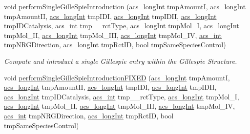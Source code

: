 \begin{DoxyCompactItemize}
void \hyperlink{a00011_a30a0827eed2860d03d5fa5318fcf86b0}{perform\-Single\-Gille\-Spie\-Introduction} (\hyperlink{a00024_a19319d75f02db4308bc5c0026d98cd85}{acs\-\_\-long\-Int} tmp\-Amount\-I, \hyperlink{a00024_a19319d75f02db4308bc5c0026d98cd85}{acs\-\_\-long\-Int} tmp\-Amount\-I\-I, \hyperlink{a00024_a19319d75f02db4308bc5c0026d98cd85}{acs\-\_\-long\-Int} tmp\-I\-D\-I, \hyperlink{a00024_a19319d75f02db4308bc5c0026d98cd85}{acs\-\_\-long\-Int} tmp\-I\-D\-I\-I, \hyperlink{a00024_a19319d75f02db4308bc5c0026d98cd85}{acs\-\_\-long\-Int} tmp\-I\-D\-Catalysis, \hyperlink{a00024_a8d277355641a098190360234e2ebde35}{acs\-\_\-int} tmp\-\_\-\-\_\-rct\-Type, \hyperlink{a00024_a19319d75f02db4308bc5c0026d98cd85}{acs\-\_\-long\-Int} tmp\-Mol\-\_\-\-I, \hyperlink{a00024_a19319d75f02db4308bc5c0026d98cd85}{acs\-\_\-long\-Int} tmp\-Mol\-\_\-\-I\-I, \hyperlink{a00024_a19319d75f02db4308bc5c0026d98cd85}{acs\-\_\-long\-Int} tmp\-Mol\-\_\-\-I\-I\-I, \hyperlink{a00024_a19319d75f02db4308bc5c0026d98cd85}{acs\-\_\-long\-Int} tmp\-Mol\-\_\-\-I\-V, \hyperlink{a00024_a8d277355641a098190360234e2ebde35}{acs\-\_\-int} tmp\-N\-R\-G\-Direction, \hyperlink{a00024_a19319d75f02db4308bc5c0026d98cd85}{acs\-\_\-long\-Int} tmp\-Rct\-I\-D, bool tmp\-Same\-Species\-Control)
\begin{DoxyCompactList}\small\item\em Compute and introduct a single Gillespie entry within the Gillespie Structure. \end{DoxyCompactList}\item 
void \hyperlink{a00011_a4ebb93b149e9ac023661f74657f634c7}{perform\-Single\-Gille\-Spie\-Introduction\-F\-I\-X\-E\-D} (\hyperlink{a00024_a19319d75f02db4308bc5c0026d98cd85}{acs\-\_\-long\-Int} tmp\-Amount\-I, \hyperlink{a00024_a19319d75f02db4308bc5c0026d98cd85}{acs\-\_\-long\-Int} tmp\-Amount\-I\-I, \hyperlink{a00024_a19319d75f02db4308bc5c0026d98cd85}{acs\-\_\-long\-Int} tmp\-I\-D\-I, \hyperlink{a00024_a19319d75f02db4308bc5c0026d98cd85}{acs\-\_\-long\-Int} tmp\-I\-D\-I\-I, \hyperlink{a00024_a19319d75f02db4308bc5c0026d98cd85}{acs\-\_\-long\-Int} tmp\-I\-D\-Catalysis, \hyperlink{a00024_a8d277355641a098190360234e2ebde35}{acs\-\_\-int} tmp\-\_\-\-\_\-rct\-Type, \hyperlink{a00024_a19319d75f02db4308bc5c0026d98cd85}{acs\-\_\-long\-Int} tmp\-Mol\-\_\-\-I, \hyperlink{a00024_a19319d75f02db4308bc5c0026d98cd85}{acs\-\_\-long\-Int} tmp\-Mol\-\_\-\-I\-I, \hyperlink{a00024_a19319d75f02db4308bc5c0026d98cd85}{acs\-\_\-long\-Int} tmp\-Mol\-\_\-\-I\-I\-I, \hyperlink{a00024_a19319d75f02db4308bc5c0026d98cd85}{acs\-\_\-long\-Int} tmp\-Mol\-\_\-\-I\-V, \hyperlink{a00024_a8d277355641a098190360234e2ebde35}{acs\-\_\-int} tmp\-N\-R\-G\-Direction, \hyperlink{a00024_a19319d75f02db4308bc5c0026d98cd85}{acs\-\_\-long\-Int} tmp\-Rct\-I\-D, bool tmp\-Same\-Species\-Control)

\end{DoxyCompactItemize}
